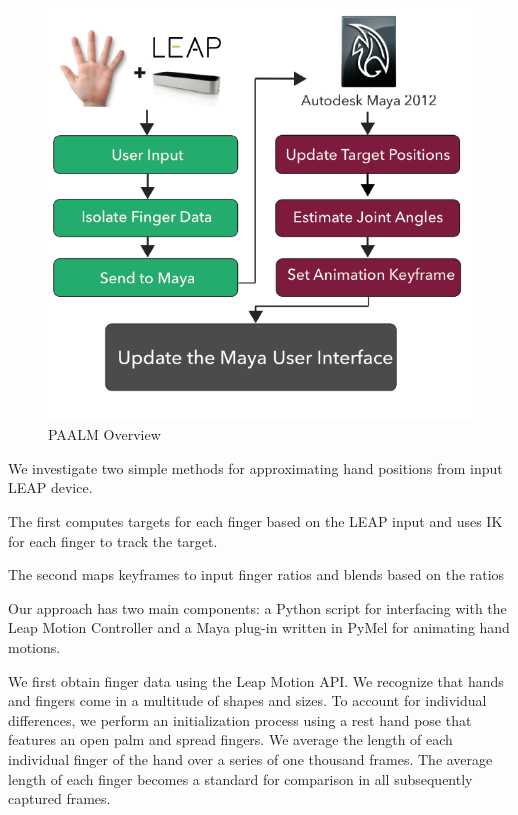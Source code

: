 \documentclass[review]{acmsiggraph}
\begin{document}
\begin{figure}
\centering
\includegraphics[scale=0.4]{Overview.png}
\vspace{-0.8cm}
\caption{PAALM Overview\label{HighLevel}}
\vspace{0.20cm}
\end{figure}


We investigate two simple methods for approximating hand positions from 
input LEAP device.

The first computes targets for each finger based on the LEAP input and 
uses IK for each finger to track the target. 

The second maps keyframes to input finger ratios and blends based on 
the ratios

Our approach has two main components: a Python script for interfacing with the Leap Motion Controller and a Maya plug-in written in PyMel for animating hand motions.

We first obtain finger data using the Leap Motion API. We recognize that hands and fingers come in a multitude of shapes and sizes. To account for individual differences, we perform an initialization process using a rest hand pose that features an open palm and spread fingers. We average the length of each individual finger of the hand over a series of one thousand frames. The average length of each finger becomes a standard for comparison in all subsequently captured frames. 
\end{document}
